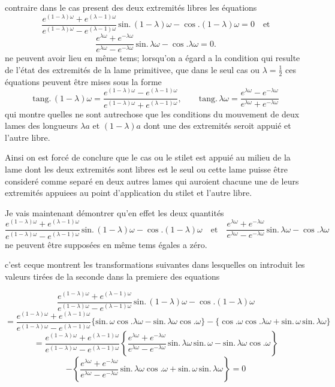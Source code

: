 \documentclass[11pt,a4paper]{article}
\begin{document}
 contraire dans le cas present des deux extremités libres les
équations
\[ \frac{e^{(1-\lambda)\omega}+e^{(\lambda-1)\omega}}{e^{(1-\lambda)\omega}-e^{(\lambda-1)\omega}}\,\text{sin.}\,(1-\lambda)\omega-\cos.(1-\lambda)\omega=0 \quad\text{et} \]
\[ \frac{e^{\lambda\omega}+e^{-\lambda\omega}}{e^{\lambda\omega}-e^{-\lambda\omega}}\,\text{sin.}\,\lambda\omega-\cos.\lambda\omega=0. \]
ne peuvent avoir lieu en même tems; lorsqu'on a égard a la condition qui
resulte de l'état des extremités de la lame primitivee, que dans le seul cas
ou $\lambda=\frac{1}{2}$ ces équations peuvent être mises sous la forme
\[ \text{tang.}\,(1-\lambda)\omega=\frac{e^{(1-\lambda)\omega}-e^{(\lambda-1)\omega}}{e^{(1-\lambda)\omega}+e^{(\lambda-1)\omega}}, \qquad \text{tang.}\,\lambda\omega=\frac{e^{\lambda\omega}-e^{-\lambda\omega}}{e^{\lambda\omega}+e^{-\lambda\omega}} \]
qui montre quelles ne sont autrechose que les conditions du mouvement de deux
lames des longueurs $\lambda a$ et $(1-\lambda)a$ dont une des extremités
seroit appuié et l'autre libre.

Ainsi  on est forcé de conclure que le cas ou le stilet est appuié
au milieu de la lame dont les deux extremités sont libres est le seul ou cette
lame puisse être consideré comme separé en deux autres lames qui auroient
chacune une de leurs extremités appuiees au point d'application du stilet et
l'autre libre.

Je vais maintenant démontrer qu'en effet les deux quantités
\[ \frac{e^{(1-\lambda)\omega}+e^{(\lambda-1)\omega}}{e^{(1-\lambda)\omega}-e^{(\lambda-1)\omega}}\,\text{sin.}\,(1-\lambda)\omega-\cos.(1-\lambda)\omega \quad\text{et}\quad \frac{e^{\lambda\omega}+e^{-\lambda\omega}}{e^{\lambda\omega}-e^{-\lambda\omega}}\,\text{sin.}\,\lambda\omega-\cos.\lambda\omega \]
ne peuvent être supposées en même tems égales a zéro.

c'est ceque montrent les transformations suivantes dans lesquelles on
introduit les valeurs tirées de la seconde dans la premiere des
 equations

\[ \frac{e^{(1-\lambda)\omega}+e^{(\lambda-1)\omega}}{e^{(1-\lambda)\omega}-e^{(\lambda-1)\omega}}\,\text{sin.}\,(1-\lambda)\omega-\cos.(1-\lambda)\omega \]
\[ =\frac{e^{(1-\lambda)\omega}+e^{(\lambda-1)\omega}}{e^{(1-\lambda)\omega}-e^{(\lambda-1)\omega}}\{\text{sin.}\,\omega\cos.\lambda\omega-\text{sin.}\,\lambda\omega\cos.\omega\}-\{\cos.\omega\cos.\lambda\omega+\text{sin.}\,\omega\,\text{sin.}\,\lambda\omega\} \]
\[ =\frac{e^{(1-\lambda)\omega}+e^{(\lambda-1)\omega}}{e^{(1-\lambda)\omega}-e^{(\lambda-1)\omega}}\left\{\frac{e^{\lambda\omega}+e^{-\lambda\omega}}{e^{\lambda\omega}-e^{-\lambda\omega}}\,\text{sin.}\,\lambda\omega\,\text{sin.}\,\omega-\text{sin.}\,\lambda\omega\cos.\omega\right\} \]
\[ -\left\{\frac{e^{\lambda\omega}+e^{-\lambda\omega}}{e^{\lambda\omega}-e^{-\lambda\omega}}\,\text{sin.}\,\lambda\omega\cos.\omega+\text{sin.}\,\omega\,\text{sin.}\,\lambda\omega\right\}=0 \]
\end{document}
